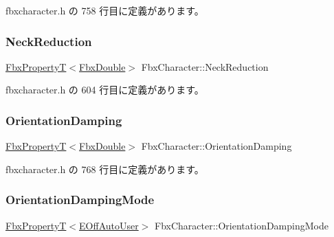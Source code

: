  fbxcharacter.\+h の 758 行目に定義があります。

\mbox{\label{class_fbx_character_ab058db9f793bd106a1756ce4ec794bc9}} 
\subsubsection{\texorpdfstring{Neck\+Reduction}{NeckReduction}}
{\footnotesize\ttfamily \hyperlink{class_fbx_property_t}{Fbx\+PropertyT}$<$\hyperlink{fbxtypes_8h_a171e72a1c46fc15c1a6c9c31948c1c5b}{Fbx\+Double}$>$ Fbx\+Character\+::\+Neck\+Reduction}



 fbxcharacter.\+h の 604 行目に定義があります。

\mbox{\label{class_fbx_character_a2be5002d31cb53a01155bf2d1306165d}} 
\subsubsection{\texorpdfstring{Orientation\+Damping}{OrientationDamping}}
{\footnotesize\ttfamily \hyperlink{class_fbx_property_t}{Fbx\+PropertyT}$<$\hyperlink{fbxtypes_8h_a171e72a1c46fc15c1a6c9c31948c1c5b}{Fbx\+Double}$>$ Fbx\+Character\+::\+Orientation\+Damping}



 fbxcharacter.\+h の 768 行目に定義があります。

\mbox{\label{class_fbx_character_a6de028b57c5ab1cd224306c2ee65d825}} 
\subsubsection{\texorpdfstring{Orientation\+Damping\+Mode}{OrientationDampingMode}}
{\footnotesize\ttfamily \hyperlink{class_fbx_property_t}{Fbx\+PropertyT}$<$\hyperlink{class_fbx_character_ab698a180e6f900ba8317257749c2ecce}{E\+Off\+Auto\+User}$>$ Fbx\+Character\+::\+Orientation\+Damping\+Mode}



